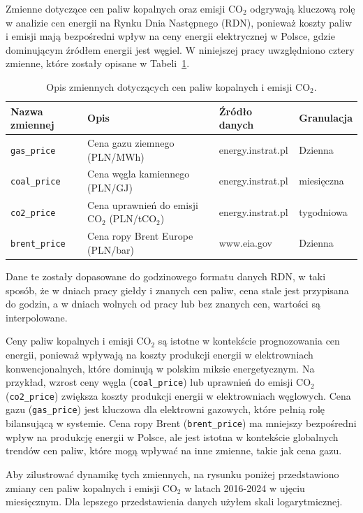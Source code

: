 Zmienne dotyczące cen paliw kopalnych oraz emisji CO$_2$ odgrywają kluczową rolę w analizie cen energii na Rynku Dnia Następnego (RDN), ponieważ koszty paliw i emisji mają bezpośredni wpływ na ceny energii elektrycznej w Polsce, gdzie dominującym źródłem energii jest węgiel. W niniejszej pracy uwzględniono cztery zmienne, które zostały opisane w Tabeli~\ref{tab:fuel_variables}.

\begin{table}[H]
    \centering
    \begin{tabular}{|l|l|l|l|}
    \hline
    \textbf{Nazwa zmiennej} & \textbf{Opis} & \textbf{Źródło danych} & \textbf{Granulacja} \\ \hline
    \texttt{gas\_price}     & Cena gazu ziemnego (PLN/MWh) & energy.instrat.pl & Dzienna \\ \hline
    \texttt{coal\_price}    & Cena węgla kamiennego (PLN/GJ) & energy.instrat.pl & miesięczna \\ \hline
    \texttt{co2\_price}     & Cena uprawnień do emisji CO$_2$ (PLN/tCO$_2$) & energy.instrat.pl & tygodniowa \\ \hline
    \texttt{brent\_price}   & Cena ropy Brent Europe (PLN/bar) & www.eia.gov & Dzienna \\ \hline
    \end{tabular}
    \caption{Opis zmiennych dotyczących cen paliw kopalnych i emisji CO$_2$.}
    \label{tab:fuel_variables}
\end{table}

Dane te zostały dopasowane do godzinowego formatu danych RDN, w taki sposób, że w dniach pracy giełdy i znanych cen paliw, cena stale jest przypisana do godzin, a w dniach wolnych od pracy lub bez znanych cen, wartości są interpolowane. 

Ceny paliw kopalnych i emisji CO$_2$ są istotne w kontekście prognozowania cen energii, ponieważ wpływają na koszty produkcji energii w elektrowniach konwencjonalnych, które dominują w polskim miksie energetycznym. Na przykład, wzrost ceny węgla (\texttt{coal\_price}) lub uprawnień do emisji CO$_2$ (\texttt{co2\_price}) zwiększa koszty produkcji energii w elektrowniach węglowych. Cena gazu (\texttt{gas\_price}) jest kluczowa dla elektrowni gazowych, które pełnią rolę bilansującą w systemie. Cena ropy Brent (\texttt{brent\_price}) ma mniejszy bezpośredni wpływ na produkcję energii w Polsce, ale jest istotna w kontekście globalnych trendów cen paliw, które mogą wpływać na inne zmienne, takie jak cena gazu.

Aby zilustrować dynamikę tych zmiennych, na rysunku poniżej przedstawiono zmiany cen paliw kopalnych i emisji CO$_2$ w latach 2016-2024 w ujęciu miesięcznym. Dla lepszego przedstawienia danych użyłem skali logarytmicznej.

